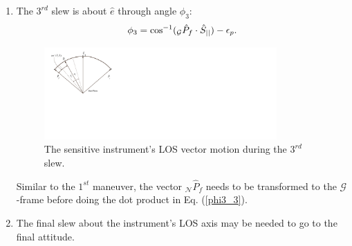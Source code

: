 \documentclass[journal ]{new-aiaa}
\begin{document}
\begin{enumerate}
		\item The $3^{rd}$ slew is about $\hat{e}$ through angle $\phi_3$:
		\begin{equation}\label{phi3_3}
		\phi_3 = \cos^{-1}(_\mathcal{G}\hat{P}_f\cdot\hat{S}_{||})-\epsilon_p.\\
		\end{equation}
		\begin{figure}[h!]
			\centering
				\includegraphics[width=3.5in]{./Figures/SVAS_4r}
					\caption{The sensitive instrument's LOS vector motion during the $3^{rd}$ slew.}
		\end{figure}
		Similar to the $1^{st}$ maneuver, the vector $_\mathcal{N}\hat{P}_f$ needs to be transformed to the $\mathcal{G}$-frame before doing the dot product in Eq. (\ref{phi3_3}). 
		\item The final slew about the instrument's LOS axis may be needed to go to the final attitude. 
	\end{enumerate}
	
	
\end{document}
